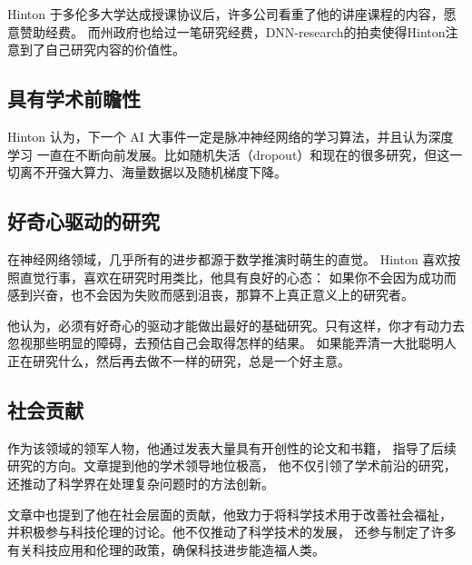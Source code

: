 \documentclass[UTF8]{homework}
\begin{document}
\begin{homeworkProblem}
Hinton 于多伦多大学达成授课协议后，许多公司看重了他的讲座课程的内容，愿意赞助经费。
而州政府也给过一笔研究经费，DNN-research的拍卖使得Hinton注意到了自己研究内容的价值性。

\subsection{具有学术前瞻性}

Hinton 认为，下一个 AI 大事件一定是脉冲神经网络的学习算法，并且认为深度学习
一直在不断向前发展。比如随机失活（dropout）和现在的很多研究，但这一切离不开强大算力、海量数据以及随机梯度下降。 
 
\subsection{好奇心驱动的研究}

在神经网络领域，几乎所有的进步都源于数学推演时萌生的直觉。
Hinton 喜欢按照直觉行事，喜欢在研究时用类比，他具有良好的心态：
如果你不会因为成功而感到兴奋，也不会因为失败而感到沮丧，那算不上真正意义上的研究者。

他认为，必须有好奇心的驱动才能做出最好的基础研究。只有这样，你才有动力去忽视那些明显的障碍，去预估自己会取得怎样的结果。
如果能弄清一大批聪明人正在研究什么，然后再去做不一样的研究，总是一个好主意。

\subsection{社会贡献}

作为该领域的领军人物，他通过发表大量具有开创性的论文和书籍，
指导了后续研究的方向。文章提到他的学术领导地位极高，
他不仅引领了学术前沿的研究，还推动了科学界在处理复杂问题时的方法创新。

文章中也提到了他在社会层面的贡献，他致力于将科学技术用于改善社会福祉，
并积极参与科技伦理的讨论。他不仅推动了科学技术的发展，
还参与制定了许多有关科技应用和伦理的政策，确保科技进步能造福人类。

\end{homeworkProblem}
\end{document}
